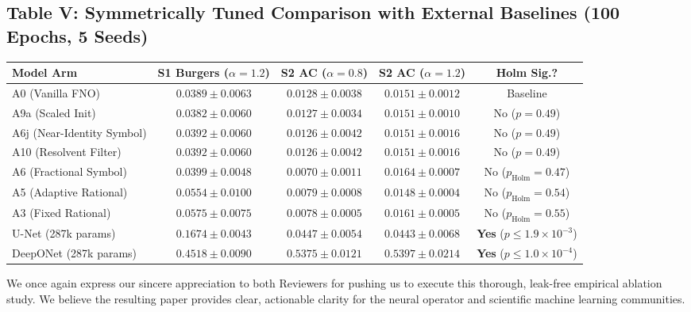 \documentclass[11pt,a4paper]{article}
\begin{document}
\subsection*{Table V: Symmetrically Tuned Comparison with External Baselines (100 Epochs, 5 Seeds)}
\begin{center}
\footnotesize
\setlength{\tabcolsep}{3pt}
\begin{tabular}{lcccc}
\toprule
\textbf{Model Arm} & \textbf{S1 Burgers ($\alpha{=}1.2$)} & \textbf{S2 AC ($\alpha{=}0.8$)} & \textbf{S2 AC ($\alpha{=}1.2$)} & \textbf{Holm Sig.?} \\
\midrule
A0 (Vanilla FNO) & $0.0389 \pm 0.0063$ & $0.0128 \pm 0.0038$ & $0.0151 \pm 0.0012$ & Baseline \\
A9a (Scaled Init) & $\mathbf{0.0382 \pm 0.0060}$ & $0.0127 \pm 0.0034$ & $0.0151 \pm 0.0010$ & No ($p=0.49$) \\
A6j (Near-Identity Symbol) & $0.0392 \pm 0.0060$ & $0.0126 \pm 0.0042$ & $0.0151 \pm 0.0016$ & No ($p=0.49$) \\
A10 (Resolvent Filter) & $0.0392 \pm 0.0060$ & $0.0126 \pm 0.0042$ & $0.0151 \pm 0.0016$ & No ($p=0.49$) \\
A6 (Fractional Symbol) & $0.0399 \pm 0.0048$ & $\mathbf{0.0070 \pm 0.0011}$ & $0.0164 \pm 0.0007$ & No ($p_{\mathrm{Holm}}=0.47$) \\
A5 (Adaptive Rational) & $0.0554 \pm 0.0100$ & $0.0079 \pm 0.0008$ & $\mathbf{0.0148 \pm 0.0004}$ & No ($p_{\mathrm{Holm}}=0.54$) \\
A3 (Fixed Rational) & $0.0575 \pm 0.0075$ & $0.0078 \pm 0.0005$ & $0.0161 \pm 0.0005$ & No ($p_{\mathrm{Holm}}=0.55$) \\
U-Net (287k params) & $0.1674 \pm 0.0043$ & $0.0447 \pm 0.0054$ & $0.0443 \pm 0.0068$ & \textbf{Yes} ($p \le 1.9\times 10^{-3}$) \\
DeepONet (287k params) & $0.4518 \pm 0.0090$ & $0.5375 \pm 0.0121$ & $0.5397 \pm 0.0214$ & \textbf{Yes} ($p \le 1.0\times 10^{-4}$) \\
\bottomrule
\end{tabular}
\end{center}

\vspace{3mm}
\noindent We once again express our sincere appreciation to both Reviewers for pushing us to execute this thorough, leak-free empirical ablation study. We believe the resulting paper provides clear, actionable clarity for the neural operator and scientific machine learning communities.
\end{document}
